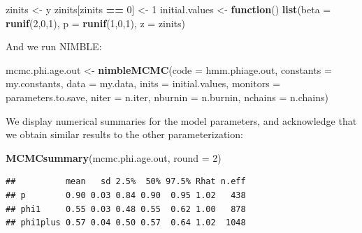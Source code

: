 \documentclass[
  12pt,
]{krantz}
\newenvironment{Shaded}{\begin{snugshade}}{\end{snugshade}}
\newcommand{\AttributeTok}[1]{\textcolor[rgb]{0.13,0.29,0.53}{#1}}
\newcommand{\ControlFlowTok}[1]{\textcolor[rgb]{0.13,0.29,0.53}{\textbf{#1}}}
\newcommand{\DecValTok}[1]{\textcolor[rgb]{0.00,0.00,0.81}{#1}}
\newcommand{\FunctionTok}[1]{\textcolor[rgb]{0.13,0.29,0.53}{\textbf{#1}}}
\newcommand{\NormalTok}[1]{#1}
\newcommand{\OtherTok}[1]{\textcolor[rgb]{0.56,0.35,0.01}{#1}}
\newcommand{\SpecialCharTok}[1]{\textcolor[rgb]{0.81,0.36,0.00}{\textbf{#1}}}
\begin{document}
\begin{Shaded}
\begin{Highlighting}[]
\NormalTok{zinits }\OtherTok{\textless{}{-}}\NormalTok{ y}
\NormalTok{zinits[zinits }\SpecialCharTok{==} \DecValTok{0}\NormalTok{] }\OtherTok{\textless{}{-}} \DecValTok{1}
\NormalTok{initial.values }\OtherTok{\textless{}{-}} \ControlFlowTok{function}\NormalTok{() }\FunctionTok{list}\NormalTok{(}\AttributeTok{beta =} \FunctionTok{runif}\NormalTok{(}\DecValTok{2}\NormalTok{,}\DecValTok{0}\NormalTok{,}\DecValTok{1}\NormalTok{),}
                                  \AttributeTok{p =} \FunctionTok{runif}\NormalTok{(}\DecValTok{1}\NormalTok{,}\DecValTok{0}\NormalTok{,}\DecValTok{1}\NormalTok{),}
                                  \AttributeTok{z =}\NormalTok{ zinits)}
\end{Highlighting}
\end{Shaded}

And we run NIMBLE:

\begin{Shaded}
\begin{Highlighting}[]
\NormalTok{mcmc.phi.age.out }\OtherTok{\textless{}{-}} \FunctionTok{nimbleMCMC}\NormalTok{(}\AttributeTok{code =}\NormalTok{ hmm.phiage.out, }
                               \AttributeTok{constants =}\NormalTok{ my.constants,}
                               \AttributeTok{data =}\NormalTok{ my.data,              }
                               \AttributeTok{inits =}\NormalTok{ initial.values,}
                               \AttributeTok{monitors =}\NormalTok{ parameters.to.save,}
                               \AttributeTok{niter =}\NormalTok{ n.iter,}
                               \AttributeTok{nburnin =}\NormalTok{ n.burnin, }
                               \AttributeTok{nchains =}\NormalTok{ n.chains)}
\end{Highlighting}
\end{Shaded}

We display numerical summaries for the model parameters, and acknowledge that we obtain similar results to the other parameterization:

\begin{Shaded}
\begin{Highlighting}[]
\FunctionTok{MCMCsummary}\NormalTok{(mcmc.phi.age.out, }\AttributeTok{round =} \DecValTok{2}\NormalTok{)}
\end{Highlighting}
\end{Shaded}

\begin{verbatim}
##          mean   sd 2.5%  50% 97.5% Rhat n.eff
## p        0.90 0.03 0.84 0.90  0.95 1.02   438
## phi1     0.55 0.03 0.48 0.55  0.62 1.00   878
## phi1plus 0.57 0.04 0.50 0.57  0.64 1.02  1048
\end{verbatim}
\end{document}

